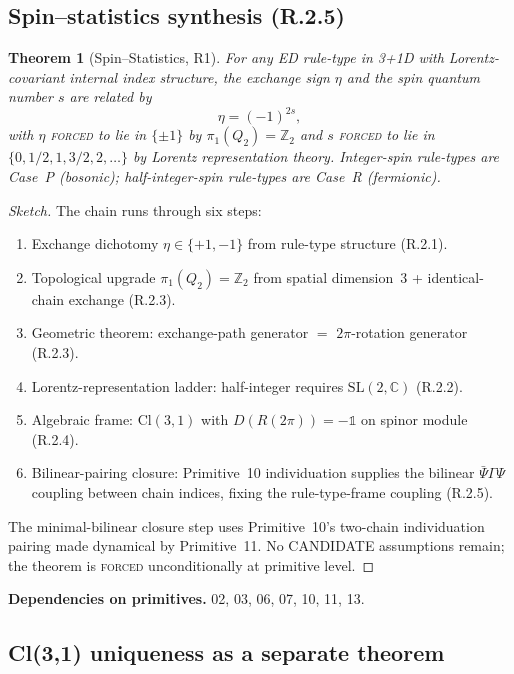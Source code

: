 \documentclass[11pt,a4paper]{article}
\newtheorem{theorem}{Theorem}[section]
\begin{document}
\subsection{Spin--statistics synthesis (R.2.5)}

\begin{theorem}[Spin--Statistics, R1]
For any ED rule-type in 3+1D with Lorentz-covariant internal index structure, the exchange sign $\eta$ and the spin quantum number $s$ are related by
\begin{equation}
\boxed{\eta = (-1)^{2s},}
\label{eq:spinstat}
\end{equation}
with $\eta$ \textsc{forced} to lie in $\{\pm 1\}$ by $\pi_1(Q_2) = \mathbb{Z}_2$ and $s$ \textsc{forced} to lie in $\{0, 1/2, 1, 3/2, 2, \dots\}$ by Lorentz representation theory. Integer-spin rule-types are Case~P (bosonic); half-integer-spin rule-types are Case~R (fermionic).
\end{theorem}

\begin{proof}[Sketch]
The chain runs through six steps:
\begin{enumerate}
  \item Exchange dichotomy $\eta \in \{+1, -1\}$ from rule-type structure (R.2.1).
  \item Topological upgrade $\pi_1(Q_2) = \mathbb{Z}_2$ from spatial dimension~3 + identical-chain exchange (R.2.3).
  \item Geometric theorem: exchange-path generator $=$ $2\pi$-rotation generator (R.2.3).
  \item Lorentz-representation ladder: half-integer requires $\mathrm{SL}(2,\mathbb{C})$ (R.2.2).
  \item Algebraic frame: $\mathrm{Cl}(3,1)$ with $D(R(2\pi)) = -\mathbb{1}$ on spinor module (R.2.4).
  \item Bilinear-pairing closure: Primitive~10 individuation supplies the bilinear $\bar\Psi \Gamma \Psi$ coupling between chain indices, fixing the rule-type-frame coupling (R.2.5).
\end{enumerate}
The minimal-bilinear closure step uses Primitive~10's two-chain individuation pairing made dynamical by Primitive~11. No CANDIDATE assumptions remain; the theorem is \textsc{forced} unconditionally at primitive level.
\end{proof}

\textbf{Dependencies on primitives.} 02, 03, 06, 07, 10, 11, 13.

\subsection{Cl(3,1) uniqueness as a separate theorem}
\end{document}

